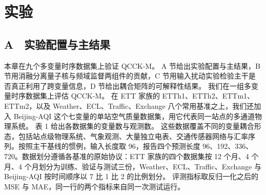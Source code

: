 



\section{实验}

\subsection{A　实验配置与主结果}

本章在九个多变量时序数据集上验证 QCCK-M。
A 节给出实验配置与主结果，B 节用消融分离量子核与频域监督两组件的贡献，C 节用输入扰动实验检验主干是否真正利用了跨变量信息，D 节给出耦合矩阵的可解释性结果。
我们在一组多变量时序数据集上评估 QCCK-M。
在 ETT 家族\cite{zhou2021informer}的 ETTh1、ETTh2、ETTm1、ETTm2，以及 Weather、ECL、Traffic、Exchange 八个常用基准\cite{wu2021autoformer}之上，我们还加入  Beijing-AQI 这个七变量的单站空气质量数据集，用它代表同一站点的多通道物理系统。
表 1 给出各数据集的变量数与观测数。
这些数据覆盖不同的变量耦合形态，包括站点级物理系统、气象观测、大量独立电表、交通传感器网络与汇率序列。按照主干基线的惯例，输入长度取 96，报告四个预测长度 96、192、336、720。数据划分遵循各基准的原始协议：ETT 家族的四个数据集按 12 个月、4 个月、4 个月划分为训练、验证与测试三份，Weather、ECL、Traffic、Exchange 与 Beijing-AQI 按时间顺序以 7 比 1 比 2 的比例划分。
评测指标取反归一化之后的 MSE 与 MAE，同一行的两个指标来自同一次测试运行。

